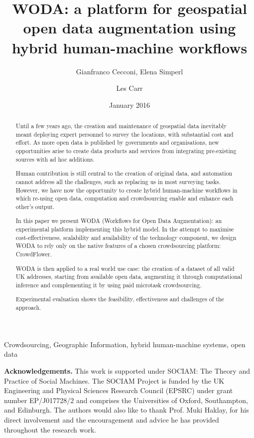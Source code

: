 \documentclass{llncs}
\title{WODA: a platform for geospatial open data augmentation using hybrid human-machine workflows}
\author{Gianfranco Cecconi\inst{1}, Elena Simperl\inst{1} \and Les Carr\inst{1}}
\institute{University of Southampton \email{gc1a13@soton.ac.uk}}
\date{January 2016}
\begin{document}
\maketitle

\begin{abstract}
Until a few years ago, the creation and maintenance of geospatial data inevitably meant deploying expert personnel to survey the locations, with substantial cost and effort. As more open data is published by governments and organisations, new opportunities arise to create data products and services from integrating pre-existing sources with ad hoc additions.

Human contribution is still central to the creation of original data, and automation cannot address all the challenges, such as replacing us in most surveying tasks. However, we have now the opportunity to create hybrid human-machine workflows in which re-using open data, computation and crowdsourcing enable and enhance each other's output. 

In this paper we present WODA (Workflows for Open Data Augmentation): an experimental platform implementing this hybrid model. In the attempt to maximise cost-effectiveness, scalability and availability of the technology component, we design WODA to rely only on the native features of a chosen crowdsourcing platform: CrowdFlower. 

WODA is then applied to a real world use case: the creation of a dataset of all valid UK addresses, starting from available open data, augmenting it through computational inference and complementing it by using paid microtask crowdsourcing. 

Experimental evaluation shows the feasibility, effectiveness and challenges of the approach.
\end{abstract}

\begin{keywords}
Crowdsourcing, Geographic Information, hybrid human-machine systems, open data 
\end{keywords}









\vspace{5mm}
\textbf{Acknowledgements.} This work is supported under SOCIAM: The Theory and Practice of Social Machines. The SOCIAM Project is funded by the UK Engineering and Physical Sciences Research Council (EPSRC) under grant number EP/J017728/2 and comprises the Universities of Oxford, Southampton, and Edinburgh. The authors would also like to thank Prof. Muki Haklay, for his direct involvement and the encouragement and advice he has provided throughout the research work. 


\end{document}
